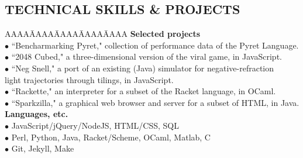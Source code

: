 \documentclass{res}
\begin{document}
\begin{resume}
\section{TECHNICAL SKILLS \& PROJECTS}
\myvspace
\begin{tabbing}
   AAAA\=AAAA\=AAAA\=AAAA\=AAAA\kill
{\bf Selected projects}\\
	\>$\bullet$ ``Bencharmarking Pyret," collection of performance data of the Pyret Language.\\
	\>$\bullet$ ``2048 Cubed," a three-dimensional version of the viral game, in JavaScript.\\
	\>$\bullet$ ``Neg Snell," a port of an existing (Java) simulator for negative-refraction\\
		\>\phantom{$\bullet$} light trajectories through tilings, in JavaScript.\\
	\>$\bullet$ ``Rackette," an interpreter for a subset of the Racket language, in OCaml.\\
	\>$\bullet$ ``Sparkzilla," a graphical web browser and server for a subset of HTML, in Java.\\	
\sbreak
{\bf Languages, etc.}\\
  \>$\bullet$ JavaScript/jQuery/NodeJS, HTML/CSS, SQL\\
  \>$\bullet$ Perl, Python, Java, Racket/Scheme, OCaml, Matlab, C\\
  \>$\bullet$ Git, Jekyll, Make\\
\end{tabbing}

\end{resume}
\end{document}
